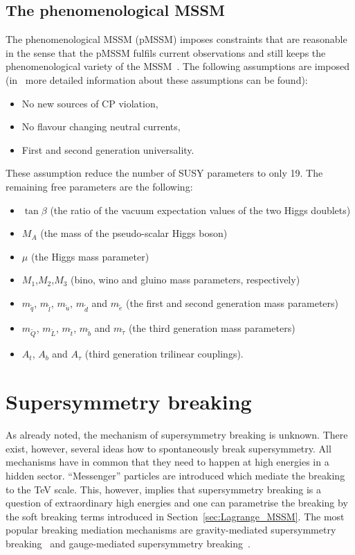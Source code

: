 \subsection{The phenomenological MSSM}
\label{subsec:pMSSM}
The phenomenological MSSM (pMSSM) imposes constraints that are reasonable in the sense that the pMSSM fulfils current observations and still keeps the phenomenological variety of the MSSM~\cite{bib:pMSSM}.
The following assumptions are imposed (in~\cite{bib:pMSSM} more detailed information about these assumptions can be found):
\begin{itemize}
\item No new sources of CP violation,
\item No flavour changing neutral currents,
\item First and second generation universality.
\end{itemize}
These assumption reduce the number of SUSY parameters to only 19.
The remaining free parameters are the following:
\begin{itemize}
\item $\tan \beta$ (the ratio of the vacuum expectation values of the two Higgs doublets)
\item $M_A$ (the mass of the pseudo-scalar Higgs boson)  
\item $\mu$ (the Higgs mass parameter)
\item $M_1$,$M_2$,$M_3$ (bino, wino and gluino mass parameters, respectively)
\item $m_{\tilde{q}}$, $m_{\tilde{l}}$, $m_{\tilde{u}}$, $m_{\tilde{d}}$ and $m_{\tilde{e}}$ (the first and second generation mass parameters)
\item  $m_{\tilde{Q}}$, $m_{\tilde{L}}$, $m_{\tilde{t}}$, $m_{\tilde{b}}$ and $m_{\tilde{\tau}}$ (the third generation mass parameters)
\item $A_t$, $A_b$ and $A_{\tau}$ (third generation trilinear couplings).
\end{itemize}

\section{Supersymmetry breaking}
As already noted, the mechanism of supersymmetry breaking is unknown.
There exist, however, several ideas how to spontaneously break supersymmetry.
All mechanisms have in common that they need to happen at high energies in a hidden sector.
``Messenger'' particles are introduced which mediate the breaking to the TeV scale.
This, however, implies that supersymmetry breaking is a question of extraordinary high energies and one can parametrise the breaking by the soft breaking terms introduced in Section~\ref{sec:Lagrange_MSSM}.
The most popular breaking mediation mechanisms are gravity-mediated supersymmetry breaking~\cite{bib:GravityMediation} and gauge-mediated supersymmetry breaking~\cite{bib:GaugeMediation}.

